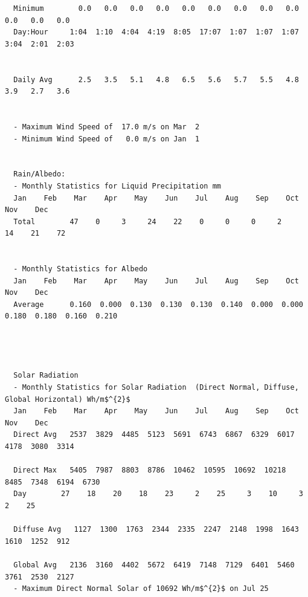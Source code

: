 \begin{lstlisting}
  Minimum        0.0   0.0   0.0   0.0   0.0   0.0   0.0   0.0   0.0   0.0   0.0   0.0
  Day:Hour     1:04  1:10  4:04  4:19  8:05  17:07  1:07  1:07  1:07  3:04  2:01  2:03


  Daily Avg      2.5   3.5   5.1   4.8   6.5   5.6   5.7   5.5   4.8   3.9   2.7   3.6


  - Maximum Wind Speed of  17.0 m/s on Mar  2
  - Minimum Wind Speed of   0.0 m/s on Jan  1


  Rain/Albedo:
  - Monthly Statistics for Liquid Precipitation mm
  Jan    Feb    Mar    Apr    May    Jun    Jul    Aug    Sep    Oct    Nov    Dec
  Total        47    0     3     24    22    0     0     0     2     14    21    72  


  - Monthly Statistics for Albedo
  Jan    Feb    Mar    Apr    May    Jun    Jul    Aug    Sep    Oct    Nov    Dec
  Average      0.160  0.000  0.130  0.130  0.130  0.140  0.000  0.000  0.180  0.180  0.160  0.210




  Solar Radiation
  - Monthly Statistics for Solar Radiation  (Direct Normal, Diffuse, Global Horizontal) Wh/m$^{2}$
  Jan    Feb    Mar    Apr    May    Jun    Jul    Aug    Sep    Oct    Nov    Dec   
  Direct Avg   2537  3829  4485  5123  5691  6743  6867  6329  6017  4178  3080  3314  

  Direct Max   5405  7987  8803  8786  10462  10595  10692  10218  8485  7348  6194  6730  
  Day        27    18    20    18    23     2    25     3    10     3     2    25  

  Diffuse Avg   1127  1300  1763  2344  2335  2247  2148  1998  1643  1610  1252  912   

  Global Avg   2136  3160  4402  5672  6419  7148  7129  6401  5460  3761  2530  2127  
  - Maximum Direct Normal Solar of 10692 Wh/m$^{2}$ on Jul 25


\end{lstlisting}
